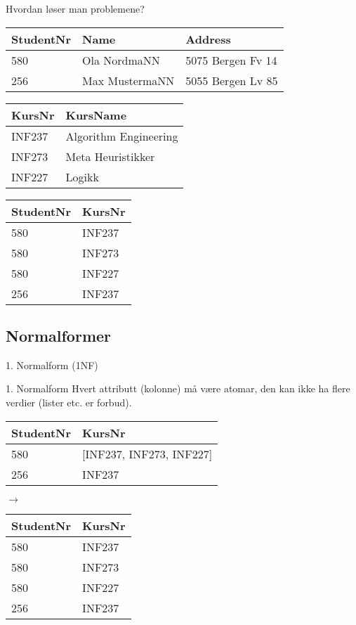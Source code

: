\begin{frame}{Hvordan løser man problemene?}
\begin{tabular}{l|l|l}
 StudentNr & Name & Address\\\hline
 580 & Ola NordmaNN & 5075 Bergen Fv 14\\
 256 & Max MustermaNN & 5055 Bergen Lv 85\\
\end{tabular}
\vfill
\begin{tabular}{l|l}
KursNr & KursName \\\hline
INF237 & Algorithm Engineering\\
INF273 & Meta Heuristikker\\
INF227 & Logikk\\
\end{tabular}
\hfill
\begin{tabular}{l|l}
 StudentNr & KursNr\\\hline
 580 & INF237\\
 580 & INF273\\
 580 & INF227\\
 256 & INF237\\
\end{tabular}
\end{frame}

\subsection*{Normalformer}
\begin{frame}{1. Normalform (1NF)}
    \begin{block}{1. Normalform}
    Hvert attributt (kolonne) må være atomar, den kan ikke ha flere verdier (lister etc. er forbud).
    \end{block}
    \vfill
    \pause
    \begin{tabular}{l|l}
     StudentNr & KursNr\\\hline
     580 & [INF237, INF273, INF227]\\
     256 & INF237\\
     \end{tabular}
     \hfill
     \pause
     $\rightarrow$
     \hfill
     \begin{tabular}{l|l}
     StudentNr & KursNr\\\hline
     580 & INF237\\
     580 & INF273\\
     580 & INF227\\
     256 & INF237\\
    \end{tabular}
\end{frame}

